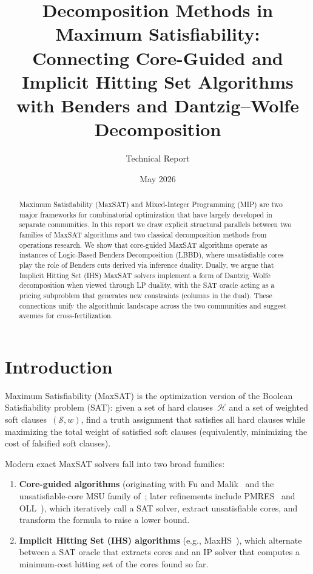 \documentclass[11pt,a4paper]{article}
\title{Decomposition Methods in Maximum Satisfiability:\\
       Connecting Core-Guided and Implicit Hitting Set Algorithms\\
       with Benders and Dantzig--Wolfe Decomposition}
\author{Technical Report}
\date{May 2026}
\begin{document}
\maketitle

\begin{abstract}
Maximum Satisfiability (MaxSAT) and Mixed-Integer Programming (MIP) are two
major frameworks for combinatorial optimization that have largely developed in
separate communities. In this report we draw explicit structural parallels
between two families of MaxSAT algorithms and two classical decomposition
methods from operations research. We show that core-guided MaxSAT algorithms
operate as instances of Logic-Based Benders Decomposition (LBBD), where
unsatisfiable cores play the role of Benders cuts derived via inference duality.
Dually, we argue that Implicit Hitting Set (IHS) MaxSAT solvers implement a
form of Dantzig--Wolfe decomposition when viewed through LP duality, with the
SAT oracle acting as a pricing subproblem that generates new constraints
(columns in the dual). These connections unify the algorithmic landscape across
the two communities and suggest avenues for cross-fertilization.
\end{abstract}

\section{Introduction}
\label{sec:intro}

Maximum Satisfiability (MaxSAT) is the optimization version of the Boolean
Satisfiability problem (SAT): given a set of hard clauses~$\mathcal{H}$ and a
set of weighted soft clauses~$(\mathcal{S}, w)$, find a truth assignment that
satisfies all hard clauses while maximizing the total weight of satisfied soft
clauses (equivalently, minimizing the cost of falsified soft clauses).

Modern exact MaxSAT solvers fall into two broad families:
\begin{enumerate}
\item \textbf{Core-guided algorithms} (originating with Fu and Malik~\citep{fu2006solving} and the unsatisfiable-core MSU family of~\citet{marquessilva2008algorithms}; later refinements include PMRES~\citep{narodytska2014maximum} and OLL~\citep{morgado2014core}), which iteratively call a SAT solver, extract unsatisfiable cores, and transform the formula to raise a lower bound.
\item \textbf{Implicit Hitting Set (IHS) algorithms} (e.g., MaxHS~\citep{davies2011solving,davies2013exploiting}), which alternate between a SAT oracle that extracts cores and an IP solver that computes a minimum-cost hitting set of the cores found so far.
\end{enumerate}
\end{document}
